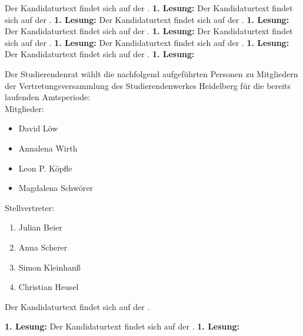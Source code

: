 {
    Der Kandidaturtext findet sich auf der \kandidaturenseite.
}{
	\textbf{1. Lesung:}
}
{
    Der Kandidaturtext findet sich auf der \kandidaturenseite.
}{
	\textbf{1. Lesung:}
}
{
    Der Kandidaturtext findet sich auf der \kandidaturenseite.
}{
	\textbf{1. Lesung:}
}
{
    Der Kandidaturtext findet sich auf der \kandidaturenseite.
}{
	\textbf{1. Lesung:}
}
{
    Der Kandidaturtext findet sich auf der \kandidaturenseite.
}{
	\textbf{1. Lesung:}
}
{
    Der Kandidaturtext findet sich auf der \kandidaturenseite.
}{
	\textbf{1. Lesung:}
}
{
    Der Kandidaturtext findet sich auf der \kandidaturenseite.
}{
	\textbf{1. Lesung:}
}
{
	Der Studierendenrat wählt die nachfolgend aufgeführten Personen zu Mitgliedern der Vertretungsversammlung des Studierendenwerkes Heidelberg für die bereits laufenden Amtsperiode:\\
	Mitglieder:
	\begin{itemize}
		\item David Löw
		\item Annalena Wirth
		\item Leon P. Köpfle
		\item Magdalena Schwörer
	\end{itemize}
	Stellvertreter:
	\begin{enumerate}
		\item Julian Beier
		\item Anna Scherer
		\item Simon Kleinhanß
		\item Christian Heusel
	\end{enumerate}
    Der Kandidaturtext findet sich auf der \kandidaturenseite.
}{
	\textbf{1. Lesung:}
}
{
    Der Kandidaturtext findet sich auf der \kandidaturenseite.
}{
	\textbf{1. Lesung:}
}
